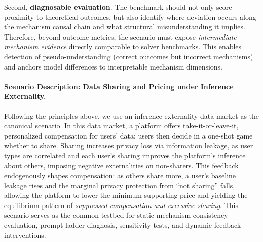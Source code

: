 \documentclass[sigconf,anonymous,review]{acmart}
\theoremstyle{definition}
\begin{document}
Second, \textbf{diagnosable evaluation}. The benchmark should not only score proximity to theoretical outcomes, but also identify where deviation occurs along the mechanism causal chain and what structural misunderstanding it implies. Therefore, beyond outcome metrics, the scenario must expose \emph{intermediate mechanism evidence} directly comparable to solver benchmarks. This enables detection of pseudo-understanding (correct outcomes but incorrect mechanisms) and anchors model differences to interpretable mechanism dimensions.



\paragraph{\textbf{Scenario Description: Data Sharing and Pricing under Inference Externality.}}
Following the principles above, we use an inference-externality data market as the canonical scenario. In this data market, a platform offers take-it-or-leave-it, personalized compensation for users' data; users then decide in a one-shot game whether to share. Sharing increases privacy loss via information leakage, as user types are correlated and each user’s sharing improves the platform’s inference about others, imposing negative externalities on non-sharers. This feedback endogenously shapes compensation: as others share more, a user’s baseline leakage rises and the marginal privacy protection from ``not sharing'' falls, allowing the platform to lower the minimum supporting price and yielding the equilibrium pattern of \emph{suppressed compensation and excessive sharing}. This scenario serves as the common testbed for static mechanism-consistency evaluation, prompt-ladder diagnosis, sensitivity tests, and dynamic feedback interventions.
\end{document}
